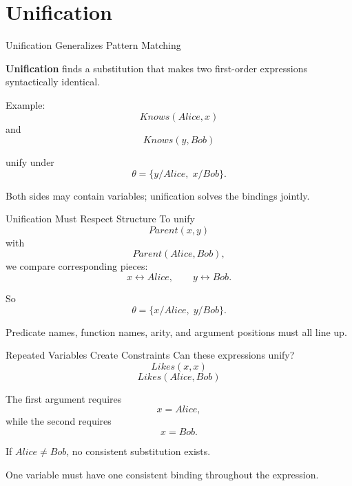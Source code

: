 \documentclass[aspectratio=169,10pt]{beamer}
\begin{document}
\section{Unification}

\begin{frame}[shrink=10]{Unification Generalizes Pattern Matching}
  \begin{cpdefinition}
    \textbf{Unification} finds a substitution that makes two first-order expressions syntactically identical.
  \end{cpdefinition}

  Example:
  \[
    Knows(Alice,x)
  \]
  and
  \[
    Knows(y,Bob)
  \]

  unify under
  \[
    \theta = \{y/Alice,\;x/Bob\}.
  \]

  \begin{keyidea}
    Both sides may contain variables; unification solves the bindings jointly.
  \end{keyidea}
\end{frame}

\begin{frame}[shrink=10]{Unification Must Respect Structure}
  To unify
  \[
    Parent(x,y)
  \]
  with
  \[
    Parent(Alice,Bob),
  \]
  we compare corresponding pieces:
  \[
    x \leftrightarrow Alice,
    \qquad
    y \leftrightarrow Bob.
  \]

  So
  \[
    \theta = \{x/Alice,\;y/Bob\}.
  \]

  \begin{keyidea}
    Predicate names, function names, arity, and argument positions must all line up.
  \end{keyidea}
\end{frame}

\begin{frame}[shrink=10]{Repeated Variables Create Constraints}
  Can these expressions unify?
  \[
    Likes(x,x)
  \]
  \[
    Likes(Alice,Bob)
  \]

  The first argument requires
  \[
    x=Alice,
  \]
  while the second requires
  \[
    x=Bob.
  \]

  If $Alice\neq Bob$, no consistent substitution exists.

  \begin{keyidea}
    One variable must have one consistent binding throughout the expression.
  \end{keyidea}
\end{frame}
\end{document}
